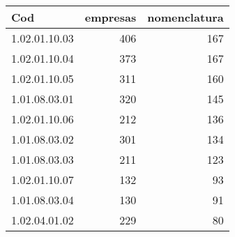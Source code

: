 \begin{table}[ht]
\centering
\begin{tabular}{lrr}
  \hline
Cod & empresas & nomenclatura \\ 
  \hline
1.02.01.10.03 & 406 & 167 \\ 
  1.02.01.10.04 & 373 & 167 \\ 
  1.02.01.10.05 & 311 & 160 \\ 
  1.01.08.03.01 & 320 & 145 \\ 
  1.02.01.10.06 & 212 & 136 \\ 
  1.01.08.03.02 & 301 & 134 \\ 
  1.01.08.03.03 & 211 & 123 \\ 
  1.02.01.10.07 & 132 &  93 \\ 
  1.01.08.03.04 & 130 &  91 \\ 
  1.02.04.01.02 & 229 &  80 \\ 
   \hline
\end{tabular}
\end{table}
